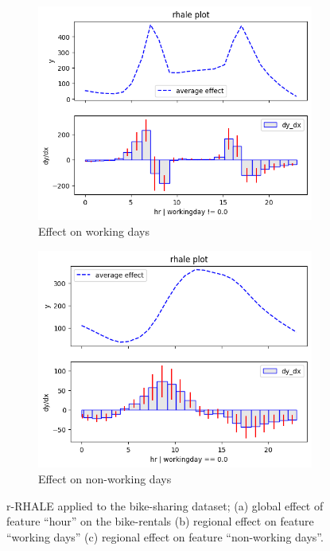 \documentclass[sigconf, nonacm]{acmart}
\begin{document}
\begin{figure}
  \begin{subfigure}[t]{0.24\textwidth}
  \centering
  \includegraphics[width=\linewidth]{figures/running_example/01_bike_sharing_dataset_29_1.png}
  \caption{Effect on working days}
  \label{subfig:regional_a}
  \end{subfigure}
  \begin{subfigure}[t]{0.24\textwidth}
  \centering  
  \includegraphics[width=\linewidth]{figures/running_example/01_bike_sharing_dataset_29_0.png}
  \caption{Effect on non-working days}
  \label{subfig:regional_b}
  \end{subfigure}
  \caption{r-RHALE applied to the bike-sharing dataset; (a) global effect of feature ``hour'' on the bike-rentals (b) regional effect on feature ``working days'' (c) regional effect on feature ``non-working days''.}
  \label{fig:main-concept}
\end{figure}
\end{document}
